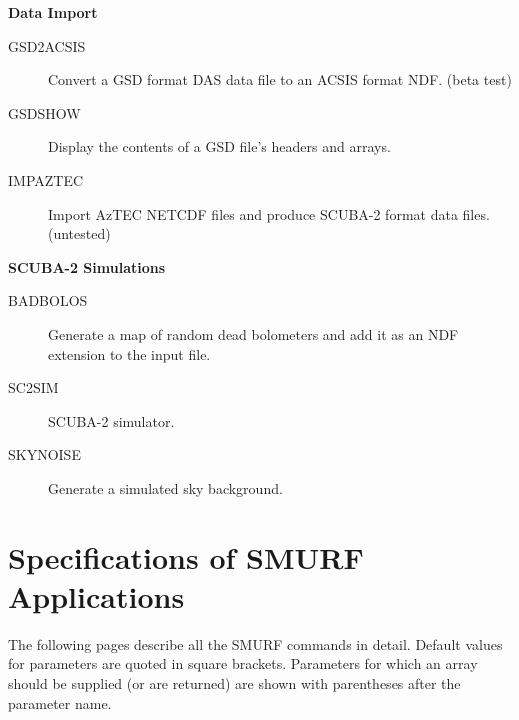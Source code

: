 \documentclass[twoside,11pt]{article}
\newcommand{\htmlref}[2]{#1}
\newcommand{\xlabel}[1]{}
\renewcommand{\_}{\texttt{\symbol{95}}}
\newcommand{\classitem}[1]{\item [\htmlref{#1}{#1}]}
\begin{document}
\begin{small}
{\large
\begin{center}
{\bf Data Import}
\end{center}
}

\begin{description}
\classitem{GSD2ACSIS}
 Convert a GSD format DAS data file to an ACSIS format NDF. (beta test)
\classitem{GSDSHOW}
 Display the contents of a GSD file's headers and arrays.
\classitem{IMPAZTEC}
 Import AzTEC NETCDF files and produce SCUBA-2 format data files. (untested)
\end{description}

{\large
\begin{center}
{\bf SCUBA-2 Simulations}
\end{center}
}

\begin{description}
\classitem{BADBOLOS}
 Generate a map of random dead bolometers and add it as an NDF extension to the input file.
\classitem{SC2SIM}
SCUBA-2 simulator.
\classitem{SKYNOISE}
 Generate a simulated sky background.
\end{description}

\end{small}

\section{\xlabel{ap_full}Specifications of SMURF Applications\label{ap:full}}

The following pages describe all the SMURF commands in detail. Default
values for parameters are quoted in square brackets. Parameters for
which an array should be supplied (or are returned) are shown with
parentheses after the parameter name.


\end{document}
